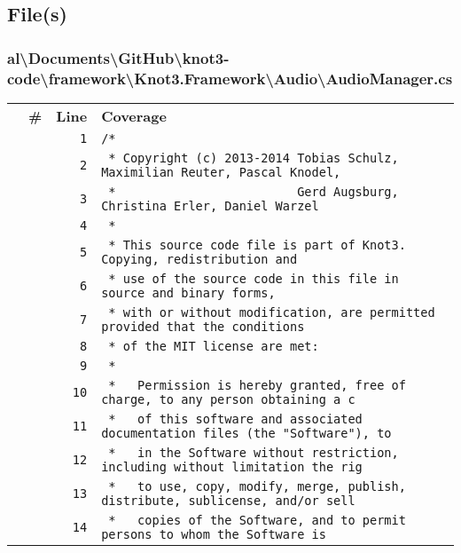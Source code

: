 \documentclass[a4paper,10pt]{article}
\begin{document}
\subsection{File(s)}
\subsubsection{al\textbackslash Documents\textbackslash GitHub\textbackslash knot3-code\textbackslash framework\textbackslash Knot3.Framework\textbackslash Audio\textbackslash AudioManager.cs}
\begin{longtable}[l]{lrrl}
\textbf{} & \textbf{\#} & \textbf{Line} & \textbf{Coverage}\\
\cellcolor{gray} &  & \verb~1~ & \verb~/*~\\
\cellcolor{gray} &  & \verb~2~ & \verb~ * Copyright (c) 2013-2014 Tobias Schulz, Maximilian Reuter, Pascal Knodel,~\\
\cellcolor{gray} &  & \verb~3~ & \verb~ *                         Gerd Augsburg, Christina Erler, Daniel Warzel~\\
\cellcolor{gray} &  & \verb~4~ & \verb~ *~\\
\cellcolor{gray} &  & \verb~5~ & \verb~ * This source code file is part of Knot3. Copying, redistribution and~\\
\cellcolor{gray} &  & \verb~6~ & \verb~ * use of the source code in this file in source and binary forms,~\\
\cellcolor{gray} &  & \verb~7~ & \verb~ * with or without modification, are permitted provided that the conditions~\\
\cellcolor{gray} &  & \verb~8~ & \verb~ * of the MIT license are met:~\\
\cellcolor{gray} &  & \verb~9~ & \verb~ *~\\
\cellcolor{gray} &  & \verb~10~ & \verb~ *   Permission is hereby granted, free of charge, to any person obtaining a c~\\
\cellcolor{gray} &  & \verb~11~ & \verb~ *   of this software and associated documentation files (the "Software"), to ~\\
\cellcolor{gray} &  & \verb~12~ & \verb~ *   in the Software without restriction, including without limitation the rig~\\
\cellcolor{gray} &  & \verb~13~ & \verb~ *   to use, copy, modify, merge, publish, distribute, sublicense, and/or sell~\\
\cellcolor{gray} &  & \verb~14~ & \verb~ *   copies of the Software, and to permit persons to whom the Software is~\\

\end{longtable}
\end{document}
